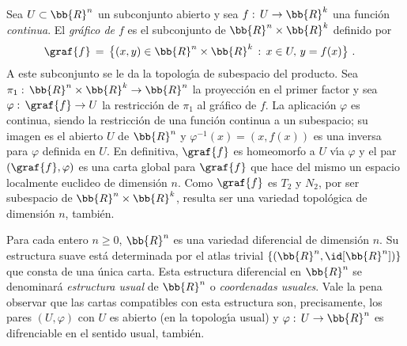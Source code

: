 



\begin{ejemplo}
	Sea $U\subset\bb{R}^{n}$ un subconjunto abierto y sea
	$f:\,U\rightarrow\bb{R}^{k}$ una funci\'{o}n \emph{continua}. El
	\emph{gr\'{a}fico de $f$} es el subconjunto de
	$\bb{R}^{n}\times\bb{R}^{k}$ definido por
	\begin{align*}
		\graf{f} & \,=\,\big\lbrace (x,y)\in\bb{R}^{n}\times\bb{R}^{k}
			\,:\,x\in U,\,y=f(x)\big\rbrace
		\text{ .}
	\end{align*}
	A este subconjunto se le da la topolog\'{\i}a de subespacio del
	producto. Sea $\pi_{1}:\,\bb{R}^{n}\times\bb{R}^{k}\rightarrow%
	\bb{R}^{n}$ la proyecci\'{o}n en el primer factor y sea
	$\varphi:\,\graf{f}\rightarrow U$ la restricci\'{o}n de $\pi_{1}$
	al gr\'{a}fico de $f$. La aplicaci\'{o}n $\varphi$ es continua,
	siendo la restricci\'{o}n de una funci\'{o}n continua a un subespacio;
	su imagen es el abierto $U$ de $\bb{R}^{n}$ y
	$\varphi^{-1}(x)=(x,f(x))$ es una inversa para $\varphi$ definida en
	$U$. En definitiva, $\graf{f}$ es homeomorfo a $U$ v\'{\i}a
	$\varphi$ y el par $(\graf{f},\varphi)$ es una carta global
	para $\graf{f}$ que hace del mismo un espacio localmente euclideo
	de dimensi\'{o}n $n$. Como $\graf{f}$ es $T_{2}$ y $N_{2}$, por
	ser subespacio de $\bb{R}^{n}\times\bb{R}^{k}$, resulta ser una
	variedad topol\'{o}gica de dimensi\'{o}n $n$, tambi\'{e}n.
\end{ejemplo}

\begin{ejemplo}
	Para cada entero $n\geq 0$, $\bb{R}^{n}$ es una variedad diferencial
	de dimensi\'{o}n $n$. Su estructura suave est\'{a} determinada por el
	atlas trivial $\{(\bb{R}^{n},\id[\bb{R}^{n}])\}$ que consta de una
	\'{u}nica carta. Esta estructura diferencial en $\bb{R}^{n}$ se
	denominar\'{a} \emph{estructura usual} de $\bb{R}^{n}$ o
	\emph{coordenadas usuales}. Vale la pena observar que las cartas
	compatibles con esta estructura son, precisamente, los pares
	$(U,\varphi)$ con $U$ es abierto (en la topolog\'{\i}a usual) y
	$\varphi:\,U\rightarrow\bb{R}^{n}$ es difrenciable en el sentido
	usual, tambi\'{e}n.
\end{ejemplo}

